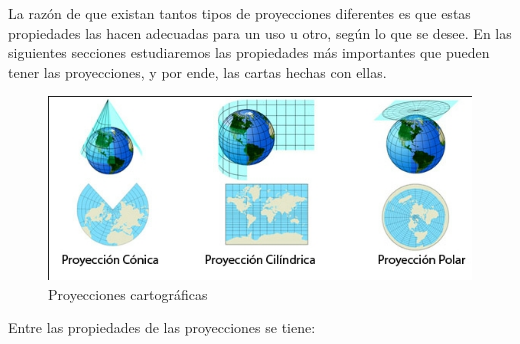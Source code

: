 La razón de que existan tantos tipos de proyecciones diferentes es que estas propiedades las hacen adecuadas para un uso u otro, según lo que se desee. En las siguientes secciones estudiaremos las propiedades más importantes que pueden tener las proyecciones, y por ende, las cartas hechas con ellas. 

\begin{figure}[!h]
  \centering
  \includegraphics[width=\textwidth]{./Imagenes/06.00.navegacion/proyecciones.jpg}
  \caption{Proyecciones cartogr\'aficas}
  \label{fig:proyecciones.cartograficas}
\end{figure}

Entre las propiedades de las proyecciones se tiene:

